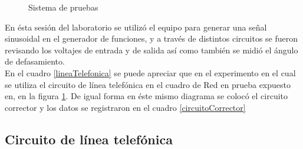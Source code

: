 \documentclass{article}
\begin{document}
\begin{figure}[h!]
    \centering
    \caption{Sistema de pruebas}
    \label{fig:sistPruebas}
\end{figure}

En ésta sesión del laboratorio se utilizó el equipo para generar una señal sinusoidal en el generador de funciones, y a través de distintos circuitos se fueron revisando los voltajes de entrada y de salida así como también se midió el ángulo de defasamiento.\\

En el cuadro \ref{lineaTelefonica} se puede apreciar que en el experimento en el cual se utiliza el circuito de línea telefónica en el cuadro de Red en prueba expuesto en, en la figura \ref{fig:sistPruebas}. De igual forma en éste mismo diagrama se colocó el circuito corrector y los datos se registraron en el cuadro \ref{circuitoCorrector}\\


\subsection{Circuito de línea telefónica}
\end{document}
